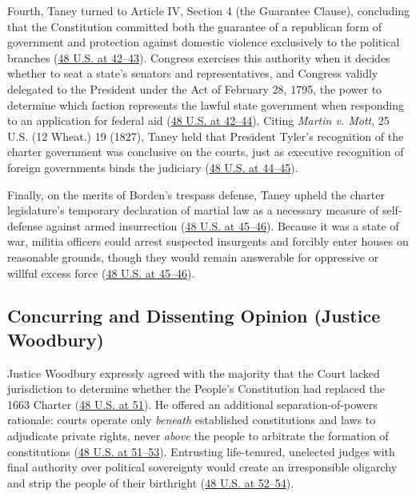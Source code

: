 \documentclass[12pt]{article}
\begin{document}
Fourth, Taney turned to Article IV, Section 4 (the Guarantee Clause), concluding that the Constitution committed both the guarantee of a republican form of government and protection against domestic violence exclusively to the political branches (\href{https://supreme.justia.com/cases/federal/us/48/1/}{48 U.S. at 42--43}). Congress exercises this authority when it decides whether to seat a state's senators and representatives, and Congress validly delegated to the President under the Act of February 28, 1795, the power to determine which faction represents the lawful state government when responding to an application for federal aid (\href{https://supreme.justia.com/cases/federal/us/48/1/}{48 U.S. at 42--44}). Citing \textit{Martin v. Mott}, 25 U.S. (12 Wheat.) 19 (1827), Taney held that President Tyler's recognition of the charter government was conclusive on the courts, just as executive recognition of foreign governments binds the judiciary (\href{https://supreme.justia.com/cases/federal/us/48/1/}{48 U.S. at 44--45}).

Finally, on the merits of Borden's trespass defense, Taney upheld the charter legislature's temporary declaration of martial law as a necessary measure of self-defense against armed insurrection (\href{https://supreme.justia.com/cases/federal/us/48/1/}{48 U.S. at 45--46}). Because it was a state of war, militia officers could arrest suspected insurgents and forcibly enter houses on reasonable grounds, though they would remain answerable for oppressive or willful excess force (\href{https://supreme.justia.com/cases/federal/us/48/1/}{48 U.S. at 45--46}).

\subsection{Concurring and Dissenting Opinion (Justice Woodbury)}

Justice Woodbury expressly agreed with the majority that the Court lacked jurisdiction to determine whether the People's Constitution had replaced the 1663 Charter (\href{https://supreme.justia.com/cases/federal/us/48/1/}{48 U.S. at 51}). He offered an additional separation-of-powers rationale: courts operate only \textit{beneath} established constitutions and laws to adjudicate private rights, never \textit{above} the people to arbitrate the formation of constitutions (\href{https://supreme.justia.com/cases/federal/us/48/1/}{48 U.S. at 51--53}). Entrusting life-tenured, unelected judges with final authority over political sovereignty would create an irresponsible oligarchy and strip the people of their birthright (\href{https://supreme.justia.com/cases/federal/us/48/1/}{48 U.S. at 52--54}).
\end{document}

